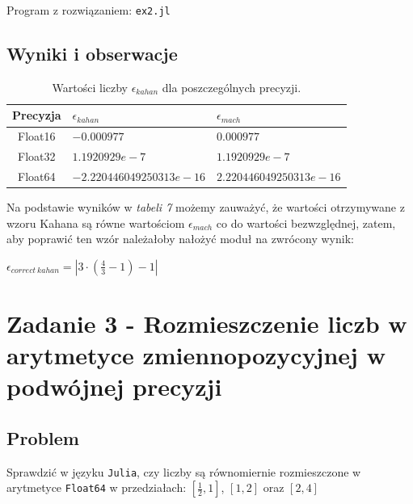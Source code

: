 \documentclass[12pt]{article}
\begin{document}
        \noindent
        Program z rozwiązaniem: \texttt{ex2.jl}
        \newline

    \subsection*{Wyniki i obserwacje}
        \begin{table}[h!]
            \centering
            \begin{tabularx}{0.74\textwidth}{c l l}
                \hline
                Precyzja & $\epsilon_{kahan}$ & $\epsilon_{mach}$ \\
                \hline
                Float16 & $-0.000977$ & $0.000977$ \\
                Float32 & $1.1920929e-7$ & $1.1920929e-7$ \\
                Float64 & $-2.220446049250313e-16$ & $2.220446049250313e-16$ \\
                \hline
            \end{tabularx}
            \caption{Wartości liczby $\epsilon_{kahan}$ dla poszczególnych precyzji.}
            \label{table:kahan_macheps}
        \end{table}

        \noindent
        Na podstawie wyników w \textit{tabeli 7} możemy zauważyć, że wartości otrzymywane z wzoru Kahana
        są równe wartościom $\epsilon_{mach}$ co do wartości bezwzględnej, zatem, aby poprawić ten wzór należałoby
        nałożyć moduł na zwrócony wynik:
        \begin{center}
        \begin{math}
            \epsilon_{correct\:kahan} = | 3 \cdot (\frac{4}{3} - 1) - 1 |
        \end{math}
        \end{center}

\newpage

\section*{Zadanie 3 - Rozmieszczenie liczb w arytmetyce \newline zmiennopozycyjnej w podwójnej precyzji}
    \subsection*{Problem}
        Sprawdzić w języku \texttt{Julia}, czy liczby są równomiernie rozmieszczone w arytmetyce \texttt{Float64}
        w przedziałach: $[\frac{1}{2}, 1]$, $[1, 2]$ oraz $[2, 4]$
        \newline
\end{document}
